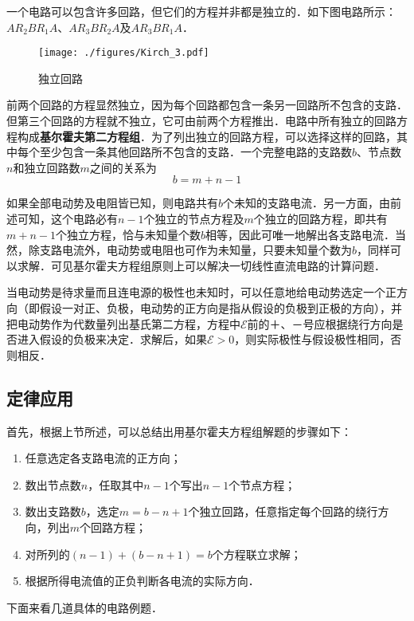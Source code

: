一个电路可以包含许多回路，但它们的方程并非都是独立的．如下图电路所示：$AR_2BR_1A$、$AR_3BR_2A$及$AR_3BR_1A$．
\begin{figure}[ht]
\centering
\texttt{[image: ./figures/Kirch\_3.pdf]}
\caption{独立回路} \label{Kirch_fig3}
\end{figure}

前两个回路的方程显然独立，因为每个回路都包含一条另一回路所不包含的支路．但第三个回路的方程就不独立，它可由前两个方程推出．电路中所有独立的回路方程构成\textbf{基尔霍夫第二方程组}．为了列出独立的回路方程，可以选择这样的回路，其中每个至少包含一条其他回路所不包含的支路．一个完整电路的支路数$b$、节点数$n $和独立回路数$m $之间的关系为
\begin{equation}
b=m+n-1
\end{equation}

如果全部电动势及电阻皆已知，则电路共有$b $个未知的支路电流．另一方面，由前述可知，这个电路必有$n-1 $个独立的节点方程及$m $个独立的回路方程，即共有$m + n -1$个独立方程，恰与未知量个数$b $相等，因此可唯一地解出各支路电流．当然，除支路电流外，电动势或电阻也可作为未知量，只要未知量个数为$b$，同样可以求解．可见基尔霍夫方程组原则上可以解决一切线性直流电路的计算问题．

当电动势是待求量而且连电源的极性也未知时，可以任意地给电动势选定一个正方向（即假设一对正、负极，电动势的正方向是指从假设的负极到正极的方向），并把电动势作为代数量列出基氏第二方程，方程中$\mathscr E$前的$＋$、$－$号应根据绕行方向是否进入假设的负极来决定．求解后，如果$\mathscr E>0$，则实际极性与假设极性相同，否则相反． 

\subsection{定律应用}

首先，根据上节所述，可以总结出用基尔霍夫方程组解题的步骤如下：
\begin{enumerate}
\item 任意选定各支路电流的正方向；
\item 数出节点数$n$，任取其中$n-1 $个写出$n - 1 $个节点方程；
\item 数出支路数$b$，选定$m=b-n+1 $个独立回路，任意指定每个回路的绕行方向，列出$m $个回路方程；
\item 对所列的$(n-1)+(b-n+1)=b $个方程联立求解；
\item 根据所得电流值的正负判断各电流的实际方向．
\end{enumerate}

下面来看几道具体的电路例题．

